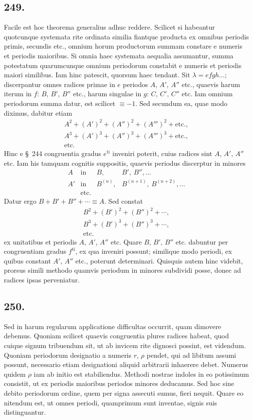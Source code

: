 \documentclass[12pt]{article}
\begin{document}
\subsection*{249.}
Facile est hoc theorema generalius adhuc reddere. Scilicet si habeantur quotcunque systemata rite ordinata similia fiantque producta ex omnibus periodis primis, secundis etc., omnium horum productorum summam constare e numeris et periodis maioribus. Si omnia haec systemata aequalia assumantur, summa potestatum quarumcunque omnium periodorum constabit e numeris et periodis maiori similibus. Iam hinc patescit, quorsum haec tendant. Sit $\lambda=efgh\ldots$; discerpantur omnes radices primae in $e$ periodos $A$, $A'$, $A''$ etc., quaevis harum iterum in $f$: $B$, $B'$, $B''$ etc., harum singulae in $g$: $C$, $C'$, $C''$ etc. Iam omnium periodorum summa datur, est scilicet $\equiv -1$. Sed secundum ea, quae modo diximus, dabitur etiam
\[
\begin{gathered}
A^2+(A')^2+(A'')^2+(A''')^2+\text{etc.},\\
A^3+(A')^3+(A'')^3+(A''')^3+\text{etc.},\\
\text{etc.}
\end{gathered}
\]
Hinc e \S~244 congruentia gradus $e^{\mathrm{ti}}$ inveniri poterit, cuius radices sint $A$, $A'$, $A''$ etc. Iam his tamquam cognitis suppositis, quaevis periodus discerptur in minores
\[
\begin{array}{llll}
A&\text{in}& B,&B',\ B'',\ldots\\
A'&\text{in}& B^{(n)},&B^{(n+1)},\ B^{(n+2)},\ldots\\
&\text{etc.}
\end{array}
\]
Datur ergo $B+B'+B''+\cdots\equiv A$. Sed constat
\[
\begin{gathered}
B^2+(B')^2+(B'')^2+\cdots,\\
B^3+(B')^3+(B'')^3+\cdots,\\
\text{etc.}
\end{gathered}
\]
ex unitatibus et periodis $A$, $A'$, $A''$ etc. Quare $B$, $B'$, $B''$ etc. dabuntur per congruentiam gradus $f^{\mathrm{ti}}$, ex qua inveniri possunt; similique modo periodi, ex quibus constant $A'$, $A''$ etc., poterunt determinari. Quisquis autem hinc videbit, prorsus simili methodo quamvis periodum in minores subdividi posse, donec ad radices ipsas perveniatur.

\subsection*{250.}
Sed in harum regularum applicatione difficultas occurrit, quam dimovere debemus. Quoniam scilicet quaevis congruentia plures radices habeat, quod cuique signum tribuendum sit, ut ab invicem rite dignosci possint, est videndum. Quoniam periodorum designatio a numeris $r$, $\rho$ pendet, qui ad libitum assumi possunt, necessario etiam designationi aliquid arbitrarii inhaerere debet. Numerus quidem $\rho$ iam ab initio est stabiliendus. Methodi nostrae indoles in eo potissimum consistit, ut ex periodis maioribus periodos minores deducamus. Sed hoc sine debito periodorum ordine, quem per signa assecuti sumus, fieri nequit. Quare eo nitendum est, ut omnes periodi, quamprimum sunt inventae, signis suis distinguantur.
\end{document}
